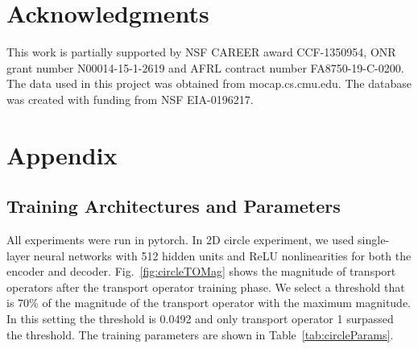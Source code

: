 \documentclass[letterpaper]{article} %
\begin{document}
\section{ Acknowledgments}
This work is partially supported by NSF CAREER award CCF-1350954, ONR grant number N00014-15-1-2619 and AFRL contract number FA8750-19-C-0200. The data used in this project was obtained from mocap.cs.cmu.edu. The database was created with funding from NSF EIA-0196217.

\section{Appendix}
\label{sec:appendix}
\subsection{Training Architectures and Parameters}
\label{subsec:trainParam}
All experiments were run in pytorch. In 2D circle experiment, we used single-layer neural networks with 512 hidden units and ReLU nonlinearities for both the encoder and decoder. Fig.~\ref{fig:circleTOMag} shows the magnitude of transport operators after the transport operator training phase. We select a threshold that is $70\%$ of the magnitude of the transport operator with the maximum magnitude. In this setting the threshold is 0.0492 and only transport operator 1 surpassed the threshold. The training parameters are shown in Table~\ref{tab:circleParams}.
\end{document}
